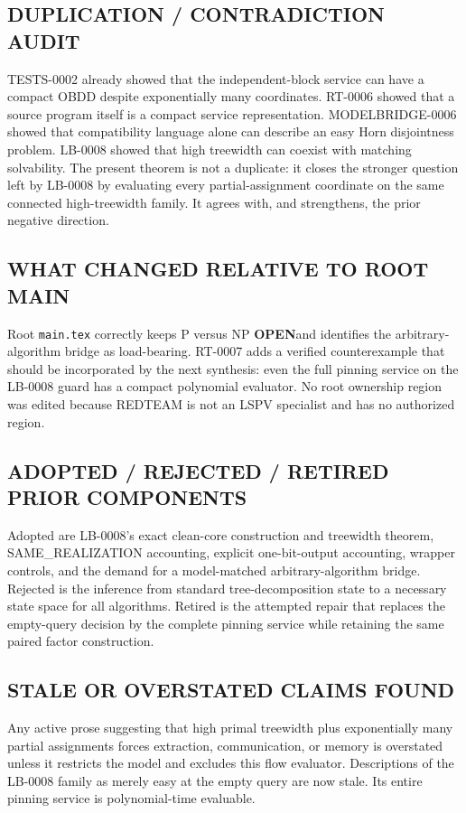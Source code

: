 \documentclass[11pt]{article}
\newcommand{\Status}[1]{\textbf{#1}}
\newcommand{\OPEN}{\Status{OPEN}}
\begin{document}
\subsection*{DUPLICATION / CONTRADICTION AUDIT}
TESTS-0002 already showed that the independent-block service can have a compact
OBDD despite exponentially many coordinates. RT-0006 showed that a source
program itself is a compact service representation. MODELBRIDGE-0006 showed
that compatibility language alone can describe an easy Horn disjointness
problem. LB-0008 showed that high treewidth can coexist with matching
solvability. The present theorem is not a duplicate: it closes the stronger
question left by LB-0008 by evaluating every partial-assignment coordinate on
the same connected high-treewidth family. It agrees with, and strengthens,
the prior negative direction.

\subsection*{WHAT CHANGED RELATIVE TO ROOT MAIN}
Root \texttt{main.tex} correctly keeps P versus NP \OPEN and identifies the
arbitrary-algorithm bridge as load-bearing. RT-0007 adds a verified
counterexample that should be incorporated by the next synthesis: even the
full pinning service on the LB-0008 guard has a compact polynomial evaluator.
No root ownership region was edited because REDTEAM is not an LSPV specialist
and has no authorized region.

\subsection*{ADOPTED / REJECTED / RETIRED PRIOR COMPONENTS}
Adopted are LB-0008's exact clean-core construction and treewidth theorem,
SAME\_REALIZATION accounting, explicit one-bit-output accounting, wrapper
controls, and the demand for a model-matched arbitrary-algorithm bridge.
Rejected is the inference from standard tree-decomposition state to a
necessary state space for all algorithms. Retired is the attempted repair
that replaces the empty-query decision by the complete pinning service while
retaining the same paired factor construction.

\subsection*{STALE OR OVERSTATED CLAIMS FOUND}
Any active prose suggesting that high primal treewidth plus exponentially many
partial assignments forces extraction, communication, or memory is
overstated unless it restricts the model and excludes this flow evaluator.
Descriptions of the LB-0008 family as merely easy at the empty query are now
stale. Its entire pinning service is polynomial-time evaluable.
\end{document}
